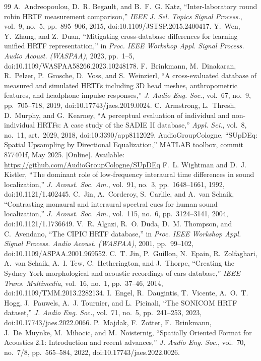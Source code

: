 \documentclass[11pt,a4paper]{article}
\begin{document}
\begin{thebibliography}{99}
 A.~Andreopoulou, D.~R. Begault, and B.~F.~G. Katz, ``Inter-laboratory round robin HRTF measurement comparison,'' \emph{IEEE J. Sel. Topics Signal Process.}, vol.~9, no.~5, pp.~895--906, 2015, doi:10.1109/JSTSP.2015.2400417.
 Y.~Wen, Y.~Zhang, and Z.~Duan, ``Mitigating cross-database differences for learning unified HRTF representation,'' in \emph{Proc. IEEE Workshop Appl. Signal Process. Audio Acoust. (WASPAA)}, 2023, pp.~1--5, doi:10.1109/WASPAA58266.2023.10248178.
 F.~Brinkmann, M.~Dinakaran, R.~Pelzer, P.~Grosche, D.~Voss, and S.~Weinzierl, ``A cross-evaluated database of measured and simulated HRTFs including 3D head meshes, anthropometric features, and headphone impulse responses,'' \emph{J. Audio Eng. Soc.}, vol.~67, no.~9, pp.~705--718, 2019, doi:10.17743/jaes.2019.0024.
 C.~Armstrong, L.~Thresh, D.~Murphy, and G.~Kearney, ``A perceptual evaluation of individual and non-individual HRTFs: A case study of the SADIE II database,'' \emph{Appl. Sci.}, vol.~8, no.~11, art.~2029, 2018, doi:10.3390/app8112029.
 AudioGroupCologne, ``SUpDEq: Spatial Upsampling by Directional Equalization,'' MATLAB toolbox, commit 877401f, May 2025. [Online]. Available: \url{https://github.com/AudioGroupCologne/SUpDEq}
 F.~L. Wightman and D.~J. Kistler, ``The dominant role of low-frequency interaural time differences in sound localization,'' \emph{J. Acoust. Soc. Am.}, vol.~91, no.~3, pp.~1648--1661, 1992, doi:10.1121/1.402445.
 C.~Jin, A.~Corderoy, S.~Carlile, and A.~van Schaik, ``Contrasting monaural and interaural spectral cues for human sound localization,'' \emph{J. Acoust. Soc. Am.}, vol.~115, no.~6, pp.~3124--3141, 2004, doi:10.1121/1.1736649.
 V.~R. Algazi, R.~O. Duda, D.~M. Thompson, and C.~Avendano, ``The CIPIC HRTF database,'' in \emph{Proc. IEEE Workshop Appl. Signal Process. Audio Acoust. (WASPAA)}, 2001, pp.~99--102, doi:10.1109/ASPAA.2001.969552.
 C.~T. Jin, P.~Guillon, N.~Epain, R.~Zolfaghari, A.~van Schaik, A.~I. Tew, C.~Hetherington, and J.~Thorpe, ``Creating the Sydney York morphological and acoustic recordings of ears database,'' \emph{IEEE Trans. Multimedia}, vol.~16, no.~1, pp.~37--46, 2014, doi:10.1109/TMM.2013.2282134.
 I.~Engel, R.~Daugintis, T.~Vicente, A.~O.~T. Hogg, J.~Pauwels, A.~J. Tournier, and L.~Picinali, ``The SONICOM HRTF dataset,'' \emph{J. Audio Eng. Soc.}, vol.~71, no.~5, pp.~241--253, 2023, doi:10.17743/jaes.2022.0066.
 P.~Majdak, F.~Zotter, F.~Brinkmann, J.~De~Muynke, M.~Mihocic, and M.~Noisternig, ``Spatially Oriented Format for Acoustics 2.1: Introduction and recent advances,'' \emph{J. Audio Eng. Soc.}, vol.~70, no.~7/8, pp.~565--584, 2022, doi:10.17743/jaes.2022.0026.

\end{thebibliography}
\end{document}
